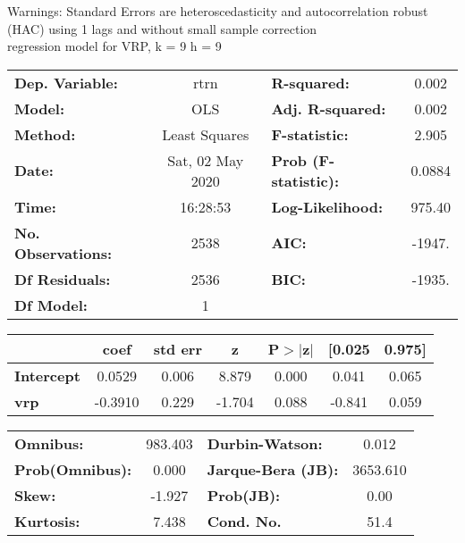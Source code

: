 Warnings: \newline
 [1] Standard Errors are heteroscedasticity and autocorrelation robust (HAC) using 1 lags and without small sample correction\\ 

regression model for VRP, k = 9 h = 9\begin{center}
\begin{tabular}{lclc}
\toprule
\textbf{Dep. Variable:}    &       rtrn       & \textbf{  R-squared:         } &     0.002   \\
\textbf{Model:}            &       OLS        & \textbf{  Adj. R-squared:    } &     0.002   \\
\textbf{Method:}           &  Least Squares   & \textbf{  F-statistic:       } &     2.905   \\
\textbf{Date:}             & Sat, 02 May 2020 & \textbf{  Prob (F-statistic):} &   0.0884    \\
\textbf{Time:}             &     16:28:53     & \textbf{  Log-Likelihood:    } &    975.40   \\
\textbf{No. Observations:} &        2538      & \textbf{  AIC:               } &    -1947.   \\
\textbf{Df Residuals:}     &        2536      & \textbf{  BIC:               } &    -1935.   \\
\textbf{Df Model:}         &           1      & \textbf{                     } &             \\
\bottomrule
\end{tabular}
\begin{tabular}{lcccccc}
                   & \textbf{coef} & \textbf{std err} & \textbf{z} & \textbf{P$> |$z$|$} & \textbf{[0.025} & \textbf{0.975]}  \\
\midrule
\textbf{Intercept} &       0.0529  &        0.006     &     8.879  &         0.000        &        0.041    &        0.065     \\
\textbf{vrp}       &      -0.3910  &        0.229     &    -1.704  &         0.088        &       -0.841    &        0.059     \\
\bottomrule
\end{tabular}
\begin{tabular}{lclc}
\textbf{Omnibus:}       & 983.403 & \textbf{  Durbin-Watson:     } &    0.012  \\
\textbf{Prob(Omnibus):} &   0.000 & \textbf{  Jarque-Bera (JB):  } & 3653.610  \\
\textbf{Skew:}          &  -1.927 & \textbf{  Prob(JB):          } &     0.00  \\
\textbf{Kurtosis:}      &   7.438 & \textbf{  Cond. No.          } &     51.4  \\
\bottomrule
\end{tabular}
\end{center}


